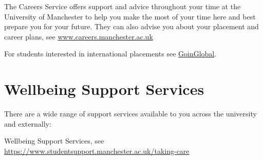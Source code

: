 \documentclass[
]{book}
\begin{document}
The Careers Service offers support and advice throughout your time at the University of Manchester to help you make the most of your time here and best prepare you for your future. They can also advise you about your placement and career plans, see \href{https://www.careers.manchester.ac.uk/}{www.careers.manchester.ac.uk} \citep{careers}

For students interested in international placements see \href{https://www.careers.manchester.ac.uk/international/goinglobal/}{GoinGlobal}. \citep{goinglobal}

\section{Wellbeing Support Services}\label{wellbeing}

There are a wide range of support services available to you across the university and externally:

Wellbeing Support Services, see \href{https://www.studentsupport.manchester.ac.uk/taking-care/}{https://www.studentsupport.manchester.ac.uk/taking-care} \citep{wellbeing}
\end{document}
